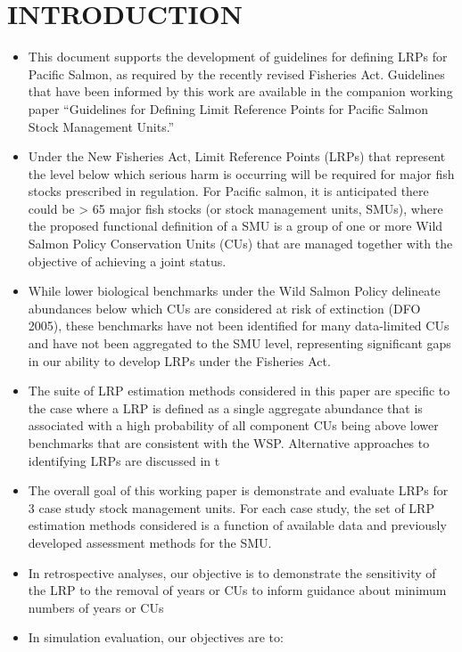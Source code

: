 \documentclass[11pt]{book}
\begin{document}
\frontmatter

\hypertarget{introduction}{%
\section{INTRODUCTION}\label{introduction}}
\begin{itemize}
\item
  This document supports the development of guidelines for defining LRPs for Pacific Salmon, as required by the recently revised Fisheries Act. Guidelines that have been informed by this work are available in the companion working paper ``Guidelines for Defining Limit Reference Points for Pacific Salmon Stock Management Units.''
\item
  Under the New Fisheries Act, Limit Reference Points (LRPs) that represent the level below which serious harm is occurring will be required for major fish stocks prescribed in regulation. For Pacific salmon, it is anticipated there could be \textgreater{} 65 major fish stocks (or stock management units, SMUs), where the proposed functional definition of a SMU is a group of one or more Wild Salmon Policy Conservation Units (CUs) that are managed together with the objective of achieving a joint status.
\item
  While lower biological benchmarks under the Wild Salmon Policy delineate abundances below which CUs are considered at risk of extinction (DFO 2005), these benchmarks have not been identified for many data-limited CUs and have not been aggregated to the SMU level, representing significant gaps in our ability to develop LRPs under the Fisheries Act.
\item
  The suite of LRP estimation methods considered in this paper are specific to the case where a LRP is defined as a single aggregate abundance that is associated with a high probability of all component CUs being above lower benchmarks that are consistent with the WSP. Alternative approaches to identifying LRPs are discussed in t
\item
  The overall goal of this working paper is demonstrate and evaluate LRPs for 3 case study stock management units. For each case study, the set of LRP estimation methods considered is a function of available data and previously developed assessment methods for the SMU.
\item
  In retrospective analyses, our objective is to demonstrate the sensitivity of the LRP to the removal of years or CUs to inform guidance about minimum numbers of years or CUs
\item
  In simulation evaluation, our objectives are to:
  \begin{enumerate}
  \def\labelenumi{\roman{enumi}.}


\end{enumerate}
\end{itemize}
\end{document}
